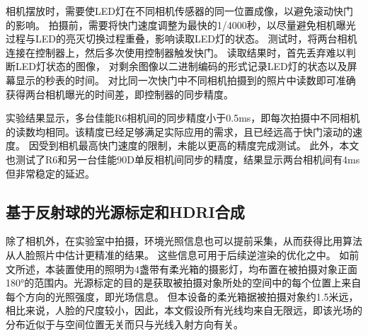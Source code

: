 相机摆放时，需要使LED灯在不同相机传感器的同一位置成像，以避免滚动快门的影响。
拍摄前，需要将快门速度调整为最快的1/4000秒，以尽量避免相机曝光过程与LED的亮灭切换过程重叠，影响读取LED灯的状态。
测试时，将两台相机连接在控制器上，然后多次使用控制器触发快门。
读取结果时，首先丢弃难以判断LED灯状态的图像，
对剩余图像以二进制编码的形式记录LED灯的状态以及屏幕显示的秒表的时间。
对比同一次快门中不同相机拍摄到的照片中读数即可准确获得两台相机曝光的时间差，即控制器的同步精度。

实验结果显示，多台佳能R6相机间的同步精度小于0.5ms，即每次拍摄中不同相机的读数均相同。该精度已经足够满足实际应用的需求，且已经远高于快门滚动的速度。
因受到相机最高快门速度的限制，未能以更高的精度完成测试。
此外，本文也测试了R6和另一台佳能90D单反相机间同步的精度，结果显示两台相机间有4ms但非常稳定的延迟。



\subsection{基于反射球的光源标定和HDRI合成}
\label{sec:light_calib}

除了相机外，在实验室中拍摄，环境光照信息也可以提前采集，从而获得比用算法从人脸照片中估计更精准的结果。
这些信息可用于后续逆渲染的优化之中。
如前文所述，本装置使用的照明为4盏带有柔光箱的摄影灯，均布置在被拍摄对象正面180°的范围内。光源标定的目的是获取被拍摄对象所处的空间中的每个位置上来自每个方向的光照强度，即光场信息。
但本设备的柔光箱据被拍摄对象约1.5米远，相比来说，人脸的尺度较小，因此，本文假设所有光线均来自无限远，即该光场的分布近似于与空间位置无关而只与光线入射方向有关。

